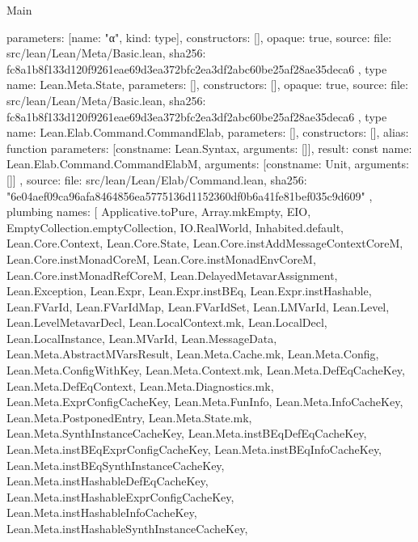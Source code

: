 \begin{lexlean}{Main}
\begin{toolingmodule}
{{      parameters: [{name: "α", kind: type{}}],
      constructors: [],
      opaque: true,
      source: {
        file: src/lean/Lean/Meta/Basic.lean,
        sha256: fc8a1b8f133d120f9261eae69d3ea372bfc2ea3df2abc60be25af28ae35deca6
      }
    },
    type{
      name: Lean.Meta.State,
      parameters: [],
      constructors: [],
      opaque: true,
      source: {
        file: src/lean/Lean/Meta/Basic.lean,
        sha256: fc8a1b8f133d120f9261eae69d3ea372bfc2ea3df2abc60be25af28ae35deca6
      }
    },
    type{
      name: Lean.Elab.Command.CommandElab,
      parameters: [],
      constructors: [],
      alias: function{
        parameters: [const{name: Lean.Syntax, arguments: []}],
        result: const{
          name: Lean.Elab.Command.CommandElabM,
          arguments: [const{name: Unit, arguments: []}]
        }
      },
      source: {
        file: src/lean/Lean/Elab/Command.lean,
        sha256: "6e04aef09ca96afa8464856ea5775136d1152360df0b6a41fe81bef035c9d609"
      }
    },
    plumbing{
      names: [
        Applicative.toPure,
        Array.mkEmpty,
        EIO,
        EmptyCollection.emptyCollection,
        IO.RealWorld,
        Inhabited.default,
        Lean.Core.Context,
        Lean.Core.State,
        Lean.Core.instAddMessageContextCoreM,
        Lean.Core.instMonadCoreM,
        Lean.Core.instMonadEnvCoreM,
        Lean.Core.instMonadRefCoreM,
        Lean.DelayedMetavarAssignment,
        Lean.Exception,
        Lean.Expr,
        Lean.Expr.instBEq,
        Lean.Expr.instHashable,
        Lean.FVarId,
        Lean.FVarIdMap,
        Lean.FVarIdSet,
        Lean.LMVarId,
        Lean.Level,
        Lean.LevelMetavarDecl,
        Lean.LocalContext.mk,
        Lean.LocalDecl,
        Lean.LocalInstance,
        Lean.MVarId,
        Lean.MessageData,
        Lean.Meta.AbstractMVarsResult,
        Lean.Meta.Cache.mk,
        Lean.Meta.Config,
        Lean.Meta.ConfigWithKey,
        Lean.Meta.Context.mk,
        Lean.Meta.DefEqCacheKey,
        Lean.Meta.DefEqContext,
        Lean.Meta.Diagnostics.mk,
        Lean.Meta.ExprConfigCacheKey,
        Lean.Meta.FunInfo,
        Lean.Meta.InfoCacheKey,
        Lean.Meta.PostponedEntry,
        Lean.Meta.State.mk,
        Lean.Meta.SynthInstanceCacheKey,
        Lean.Meta.instBEqDefEqCacheKey,
        Lean.Meta.instBEqExprConfigCacheKey,
        Lean.Meta.instBEqInfoCacheKey,
        Lean.Meta.instBEqSynthInstanceCacheKey,
        Lean.Meta.instHashableDefEqCacheKey,
        Lean.Meta.instHashableExprConfigCacheKey,
        Lean.Meta.instHashableInfoCacheKey,
        Lean.Meta.instHashableSynthInstanceCacheKey,
}}
\end{toolingmodule}
\end{lexlean}
